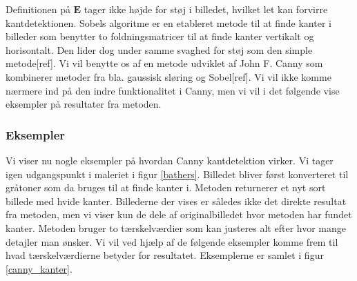 {Definitionen på $\mathbf{E}$ tager ikke højde for støj i billedet,
hvilket let kan forvirre kantdetektionen. Sobels algoritme er en
etableret metode til at finde kanter i billeder som benytter to
foldningsmatricer til at finde kanter vertikalt og horisontalt. Den
lider dog under samme svaghed for støj som den simple metode[ref]. Vi
vil benytte os af en metode udviklet af John F. Canny som kombinerer
metoder fra bla. gaussisk sløring og Sobel[ref]. Vi vil ikke komme
nærmere ind på den indre funktionalitet i Canny, men vi vil i det
følgende vise eksempler på resultater fra metoden.

\subsubsection*{Eksempler}
Vi viser nu nogle eksempler på hvordan Canny kantdetektion virker. Vi
tager igen udgangspunkt i maleriet i figur \ref{bathers}. Billedet
bliver først konverteret til gråtoner som da bruges til at finde kanter
i. Metoden returnerer et nyt sort billede med hvide kanter. Billederne
der vises er således ikke det direkte resultat fra metoden, men vi viser
kun de dele af originalbilledet hvor metoden har fundet kanter. Metoden
bruger to tærskelværdier som kan justeres alt efter hvor mange detajler
man ønsker. Vi vil ved hjælp af de følgende eksempler komme frem til
hvad tærskelværdierne betyder for resultatet. Eksemplerne er samlet i
figur \ref{canny_kanter}.

}
